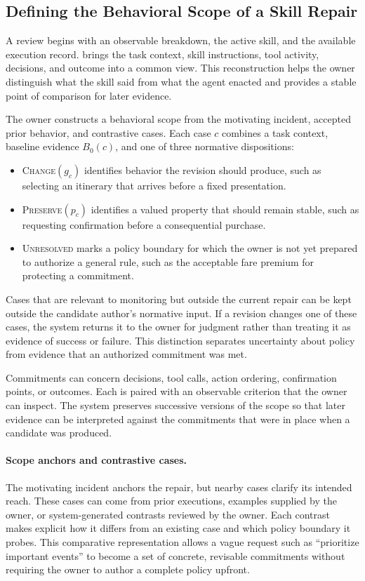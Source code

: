 \subsection{Defining the Behavioral Scope of a Skill Repair}
\label{sec:behavioral-scope}

A review begins with an observable breakdown, the active skill, and the
available execution record. \systemname{} brings the task context, skill
instructions, tool activity, decisions, and outcome into a common view. This
reconstruction helps the owner distinguish what the skill said from what the
agent enacted and provides a stable point of comparison for later evidence.

The owner constructs a behavioral scope from the motivating incident,
accepted prior behavior, and contrastive cases. Each case $c$ combines a task
context, baseline evidence $B_0(c)$, and one of three normative dispositions:

\begin{itemize}[leftmargin=*]
    \item \textsc{Change}$(g_c)$ identifies behavior the revision should
    produce, such as selecting an itinerary that arrives before a fixed
    presentation.
    \item \textsc{Preserve}$(p_c)$ identifies a valued property that should
    remain stable, such as requesting confirmation before a consequential
    purchase.
    \item \textsc{Unresolved} marks a policy boundary for which the owner is
    not yet prepared to authorize a general rule, such as the acceptable fare
    premium for protecting a commitment.
\end{itemize}

Cases that are relevant to monitoring but outside the current repair can be
kept outside the candidate author's normative input. If a revision changes one
of these cases, the system returns it to the owner for judgment rather than
treating it as evidence of success or failure. This distinction separates
uncertainty about policy from evidence that an authorized commitment was met.

Commitments can concern decisions, tool calls, action ordering, confirmation
points, or outcomes. Each is paired with an observable criterion that the
owner can inspect. The system preserves successive versions of the scope so
that later evidence can be interpreted against the commitments that were in
place when a candidate was produced.

\paragraph{Scope anchors and contrastive cases.}
The motivating incident anchors the repair, but nearby cases clarify its
intended reach. These cases can come from prior executions, examples supplied
by the owner, or system-generated contrasts reviewed by the owner. Each
contrast makes explicit how it differs from an existing case and which policy
boundary it probes. This comparative representation allows a vague request
such as ``prioritize important events'' to become a set of concrete, revisable
commitments without requiring the owner to author a complete policy upfront.

